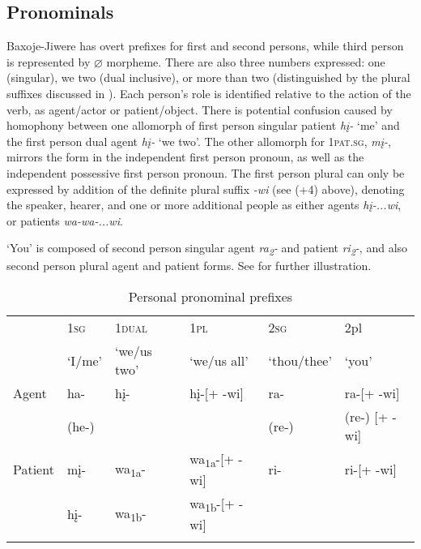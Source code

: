 \documentclass[output=paper]{LSP/langsci}
\begin{document}
\subsection{Pronominals}
Baxoje-Jiwere has overt prefixes for first and second persons, while third person is represented by $\varnothing$ morpheme.  There are also three numbers expressed:  one (singular), we two (dual inclusive), or more than two (distinguished by the plural suffixes discussed in ).  Each person's role is identified relative to the action of the verb, as agent/actor or patient/object. There is potential confusion caused by homophony between one allomorph of first person singular patient \textit{h\k{i}-} `me' and the first person dual agent \textit{h\k{i}-} `we two'.  The other allomorph for 1\textsc{pat.sg}, \textit{m\k{i}-}, mirrors the form in the independent first person pronoun, as well as the independent possessive first person  pronoun.  The first person plural can only be expressed by addition of the definite plural suffix \textit{-wi} (see (+4) above), denoting the speaker, hearer, and one or more additional people as either agents \textit{h\k{i}-...wi}, or patients \textit{wa-wa-...wi}.  

`You' is composed of second person singular agent \textit{ra\textsubscript{2}-} and patient \textit{ri\textsubscript{2}-}, and also second person plural agent and patient forms.  See  for further illustration. 

\begin{table}
\begin{tabular}{ l l l l l l }
\lsptoprule
& 1\textsc{sg} &  1\textsc{dual} & 1\textsc{pl}  & 2\textsc{sg} &  2{pl}  \\
& `I/me' & `we/us two' & `we/us all' & `thou/thee' & `you' \\
\midrule
Agent & ha-  	& h\k{i}- & h\k{i}-[+ -wi] & ra-  & ra-[+ -wi] \\
& (he-) & & &(re-) & (re-) [+ -wi] \\

Patient & m\k{i}- & wa\textsubscript{1a}-	& wa\textsubscript{1a}-[+ -wi]	&  ri- & ri-[+ -wi] \\
& h\k{i}-	& wa\textsubscript{1b}- & wa\textsubscript{1b}-[+ -wi]	& & \\
\lspbottomrule \end{tabular}

\caption{Personal pronominal prefixes} \label{personalpronominals}
\end{table}
\end{document}
